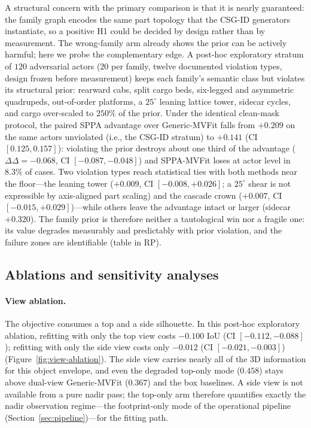 \documentclass[11pt,a4paper]{article}
\begin{document}
A structural concern with the primary comparison is that it is nearly
guaranteed: the family graph encodes the same part topology that the CSG-ID
generators instantiate, so a positive H1 could be decided by design rather
than by measurement. The wrong-family arm already shows the prior can be
actively harmful; here we probe the complementary edge. A post-hoc
exploratory stratum of \(120\) adversarial actors (\(20\) per family, twelve
documented violation types, design frozen before measurement) keeps each
family's semantic class but violates its structural prior: rearward cabs,
split cargo beds, six-legged and asymmetric quadrupeds, out-of-order
platforms, a \(25^{\circ}\) leaning lattice tower, sidecar cycles, and cargo
over-scaled to \(250\%\) of the prior. Under the identical clean-mask
protocol, the paired SPPA advantage over Generic-MVFit falls from \(+0.209\)
on the same actors unviolated (i.e., the CSG-ID stratum) to \(+0.141\) (CI
\([0.125,0.157]\)): violating
the prior destroys about one third of the advantage
(\(\Delta\Delta=-0.068\), CI \([-0.087,-0.048]\)) and SPPA-MVFit loses at
actor level in \(8.3\%\) of cases. Two violation types reach statistical
ties with both methods near the floor---the leaning tower (\(+0.009\), CI
\([-0.008,+0.026]\); a \(25^{\circ}\) shear is not expressible by
axis-aligned part scaling) and the cascade crown (\(+0.007\), CI
\([-0.015,+0.029]\))---while others leave the advantage intact or larger
(sidecar \(+0.320\)). The family prior is therefore neither a tautological
win nor a fragile one: its value degrades measurably and predictably with
prior violation, and the failure zones are identifiable
(table in RP).

\subsection{Ablations and sensitivity analyses}
\label{sec:ablations}

\paragraph{View ablation.}
\label{sec:view-ablation}
The objective consumes a top and a side silhouette. In this post-hoc
exploratory ablation, refitting with only the
top view costs \(-0.100\) IoU (CI \([-0.112,-0.088]\)); refitting with only
the side view costs only \(-0.012\) (CI \([-0.021,-0.003]\))
(Figure~\ref{fig:view-ablation}). The side view carries nearly all of the 3D
information for this object envelope, and even the degraded top-only mode
(\(0.458\)) stays above dual-view Generic-MVFit (\(0.367\)) and the box
baselines. A side view is not available from a pure nadir pass; the top-only
arm therefore quantifies exactly the nadir observation regime---the
footprint-only mode of the operational pipeline
(Section~\ref{sec:pipeline})---for the fitting path.
\end{document}
